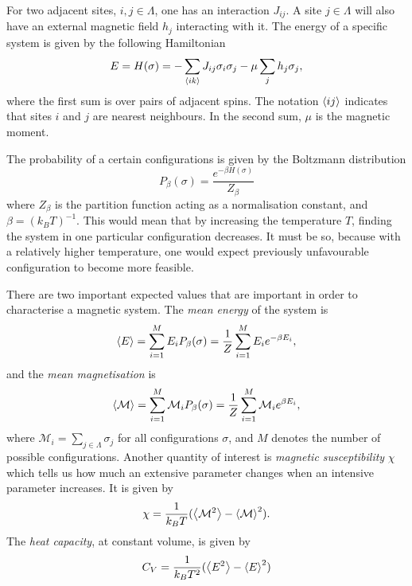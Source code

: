 \documentclass[10pt,a4paper]{amsart}
\begin{document}
For two adjacent sites, $i,j \in \Lambda$, one has an interaction $J_{ij}$. A site $j \in \Lambda$ will also have an external magnetic field $h_j$ interacting with it. The energy of a specific system is given by the following Hamiltonian
\begin{equation}
\label{eq:IsingHamilton}
E = H(\sigma)= -\sum_{\ev{ik}}J_{ij}\sigma_i \sigma_j - \mu \sum_j h_j \sigma_j,
\end{equation}
where the first sum is over pairs of adjacent spins. The notation $\ev{ij}$ indicates that sites $i$ and $j$ are nearest neighbours. In the second sum, $\mu$ is the magnetic moment.

The probability of a certain configurations is given by the Boltzmann distribution
\begin{equation}
\label{eq:Boltzmann}
P_\beta(\sigma) = \frac{e^{-\beta H(\sigma)}}{Z_\beta}
\end{equation}
where $Z_\beta$ is the partition function acting as a normalisation constant, and $\beta=(k_BT)^{-1}$. This would mean that by increasing the temperature $T$, finding the system in one particular configuration decreases. It must be so, because with a relatively higher temperature, one would expect previously unfavourable configuration to become more feasible.

There are two important expected values that are important in order to characterise a magnetic system. The \emph{mean energy} of the system is
\begin{equation}
\label{eq:meanenergy}
\ev{E} = \sum_{i=1}^ME_iP_\beta(\sigma) = \frac{1}{Z}\sum_{i=1}^ME_ie^{-\beta E_i},
\end{equation}
and the \emph{mean magnetisation} is
\begin{equation}
\label{eq:meanmagnet}
\ev{\mathcal{M}} = \sum_{i=1}^M\mathcal{M}_iP_\beta(\sigma) = \frac{1}{Z}\sum_{i=1}^M\mathcal{M}_ie^{\beta E_i},
\end{equation}
where $\mathcal{M}_i = \sum_{j \in \Lambda}\sigma_j$ for all configurations $\sigma$, and $M$ denotes the number of possible configurations. Another quantity of interest is \emph{magnetic susceptibility} $\chi$ which tells us how much an extensive parameter changes when an intensive parameter increases. It is given by
\begin{equation}
\label{eq:susceptibility}
\chi = \frac{1}{k_BT}(\ev{\mathcal{M}^2} - \ev{\mathcal{M}}^2).
\end{equation}
The \emph{heat capacity}, at constant volume, is given by
\begin{equation}
\label{eq:heatcap}
C_V = \frac{1}{k_BT^2}(\ev{E^2}-\ev{E}^2)
\end{equation}
\end{document}
